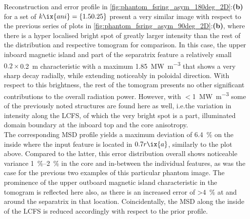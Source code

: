                 Reconstruction and error profile in \cref{fig:phantom_fsring_asym_180deg_2D}:\textbf{(b)} for a set of $k\ix{ani}=\left\{1.5 0.25\right\}$ present a very similar image with respect to the previous series of plots in \cref{fig:phantom_fsring_asym_90deg_2D}:\textbf{(b)}, where there is a hyper localised bright spot of greatly larger intensity than the rest of the distribution and respective tomogram for comparison. In this case, the upper inboard magnetic island and part of the separatrix feature a relatively small $0.2\times$\SI{0.2}{\meter} characteristic with a maximum \SI{1.85}{\mega\watt\per\cubic\meter} that shows a very sharp decay radially, while extending noticeably in poloidal direction. With respect to this brightness, the rest of the tomogram presents no other significant contributions to the overall radiation power. However, with $<$\SI{1}{\mega\watt\per\cubic\meter} some of the previously noted structures are found here as well, i.e.the variation in intensity along the LCFS, of which the very bright spot is a part, illuminated domain boundary at the inboard top and the core anisotropy.\\%
                The corresponding MSD profile yields a maximum deviation of \SI{6.4}{\percent} on the inside where the input feature is located in $0.7r\ix{a}$, similarly to the plot above. Compared to the latter, this error distribution overall shows noticeable variance \SIrange{1}{2}{\percent} in the core and in-between the individual features, as was the case for the previous two examples of this particular phantom image. The prominence of the upper outboard magnetic island characteristic in the tomogram is reflected here also, as there is an increased error of >\SI{4}{\percent} at and around the separatrix in that location. Coincidentally, the MSD along the inside of the LCFS is reduced accordingly with respect to the prior profile.\\%
%
